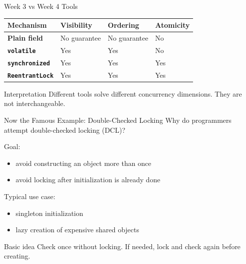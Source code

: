 \documentclass[aspectratio=169,11pt]{beamer}
\begin{document}
	\begin{frame}{Week 3 vs Week 4 Tools}
		\centering
		\begin{tabular}{>{\bfseries}m{3cm} >{\centering\arraybackslash}m{2cm} >{\centering\arraybackslash}m{2cm} >{\centering\arraybackslash}m{2cm}}
			\toprule
			Mechanism & Visibility & Ordering & Atomicity \\
			\midrule
			Plain field & No guarantee & No guarantee & No \\
			\texttt{volatile} & Yes & Yes & No \\
			\texttt{synchronized} & Yes & Yes & Yes \\
			\texttt{ReentrantLock} & Yes & Yes & Yes \\
			\bottomrule
		\end{tabular}
		
		\vspace{0.4cm}
		
		\begin{block}{Interpretation}
			Different tools solve different concurrency dimensions.  
			They are not interchangeable.
		\end{block}
	\end{frame}
	
	\begin{frame}{Now the Famous Example: Double-Checked Locking}
		Why do programmers attempt double-checked locking (DCL)?
		
		\vspace{0.25cm}
		
		Goal:
		\begin{itemize}
			\item avoid constructing an object more than once
			\item avoid locking after initialization is already done
		\end{itemize}
		
		\vspace{0.25cm}
		
		Typical use case:
		\begin{itemize}
			\item singleton initialization
			\item lazy creation of expensive shared objects
		\end{itemize}
		
		\vspace{0.35cm}
		
		\begin{exampleblock}{Basic idea}
			Check once without locking.  
			If needed, lock and check again before creating.
		\end{exampleblock}
	\end{frame}
	
\end{document}
